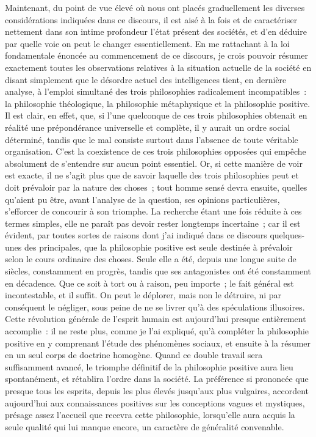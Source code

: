 \documentclass[french,twoside]{book} %
\begin{document}
Maintenant, du point de vue élevé où nous ont placés graduellement les diverses considérations indiquées dans ce discours, il est aisé à la fois et de caractériser nettement dans son intime profondeur l’état présent des sociétés, et d’en déduire par quelle voie on peut le changer essentiellement. En me rattachant à la loi fondamentale énoncée au commencement de ce discours, je crois pouvoir résumer exactement toutes les observations relatives à la situation actuelle de la société en disant simplement que le désordre actuel des intelligences tient, en dernière analyse, à l’emploi simultané des trois philosophies radicalement incompatibles : la philosophie théologique, la philosophie métaphysique et la philosophie positive. Il est clair, en effet, que, si l’une quelconque de ces trois philosophies obtenait en réalité une prépondérance universelle et complète, il y aurait un ordre social déterminé, tandis que le mal consiste surtout dans l’absence de toute véritable organisation. C’est la coexistence de ces trois philosophies opposées qui empêche absolument de s’entendre sur aucun point essentiel. Or, si cette manière de voir est exacte, il ne s’agit plus que de savoir laquelle des trois philosophies peut et doit prévaloir par la nature des choses ; tout homme sensé devra ensuite, quelles qu’aient pu être, avant l’analyse de la question, ses opinions particulières, s’efforcer de concourir à son triomphe. La recherche étant une fois réduite à ces termes simples, elle ne paraît pas devoir rester longtemps incertaine ; car il est évident, par toutes sortes de raisons dont j’ai indiqué dans ce discours quelques-unes des principales, que la philosophie positive est seule destinée à prévaloir selon le cours ordinaire des choses. Seule elle a été, depuis une longue suite de siècles, constamment en progrès, tandis que ses antagonistes ont été constamment en décadence. Que ce soit à tort ou à raison, peu importe ; le fait général est incontestable, et il suffit. On peut le déplorer, mais non le détruire, ni par conséquent le négliger, sous peine de ne se livrer qu’à des spéculations illusoires. Cette révolution générale de l’esprit humain est aujourd’hui presque entièrement accomplie : il ne reste plus, comme je l’ai expliqué, qu’à compléter la philosophie positive en y comprenant l’étude des phénomènes sociaux, et ensuite à la résumer en un seul corps de doctrine homogène. Quand ce double travail sera suffisamment avancé, le triomphe définitif de la philosophie positive aura lieu spontanément, et rétablira l’ordre dans la société. La préférence si prononcée que presque tous les esprits, depuis les plus élevés jusqu’aux plus vulgaires, accordent aujourd’hui aux connaissances positives sur les conceptions vagues et mystiques, présage assez l’accueil que recevra cette philosophie, lorsqu’elle aura acquis la seule qualité qui lui manque encore, un caractère de généralité convenable.\par
\end{document}
